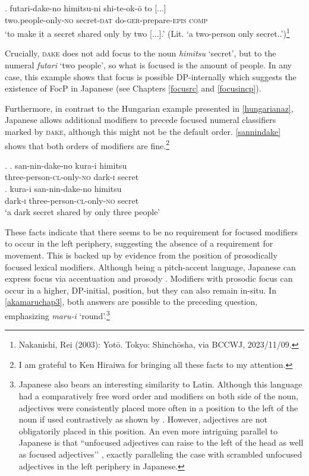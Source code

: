 \documentclass [output=book,colorlinks,citecolor=brown]{langscibook}
\begin{document}

\exg. futari-dake-no himitsu-ni shi-te-ok-ō to [...]\\
two.people-only-\textsc{no} secret-\textsc{dat} do-\textsc{ger}-prepare-\textsc{epis} \textsc{comp}\\
`to make it a secret shared only by two [...].’ (Lit. `a two-person only secret..’)\footnote{Nakanishi, Rei (2003): Yotō. Tokyo: Shinchōsha, via BCCWJ, 2023/11/09.} \label{himitsu}

Crucially, \textsc{dake} does not add focus to the noun \textit{himitsu} `secret’, but to the numeral \textit{futari} `two people’, so what is focused is the amount of people. In any case, this example shows that focus is possible DP-internally which suggests the existence of FocP in Japanese (see Chapters \ref{focusrc} and \ref{focusincp}).

Furthermore, in contrast to the Hungarian example presented in \ref{hungarianaz}, Japanese allows additional modifiers to precede focused numeral classifiers marked by \textsc{dake}, although this might not be the default order. \ref{sannindake} shows that both orders of modifiers are fine.\footnote{I am grateful to Ken Hiraiwa for bringing all these facts to my attention.}


\ex. \label{sannindake} \ag. san-nin-dake-no kura-i himitsu\\
three-person-\textsc{cl}-only-\textsc{no} dark-\textsc{i} secret\\
\bg. kura-i san-nin-dake-no himitsu\\
dark-\textsc{i} three-person-\textsc{cl}-only-\textsc{no} secret\\
`a dark secret shared by only three people’

These facts indicate that there seems to be no requirement for focused modifiers to occur in the left periphery, suggesting the absence of a requirement for movement. This is backed up by evidence from the position of prosodically focused lexical modifiers. Although being a pitch-accent language, Japanese can express focus via accentuation and prosody \citep{beckman:1986:intonational, hiraiwa:2012:syntactic, tomioka:2009:contrastive}. Modifiers with prosodic focus can occur in a higher, DP-initial, position, but they can also remain in-situ. In \ref{akamaruchap3}, both answers are possible to the preceding question, emphasizing \textit{maru-i} `round’.\footnote{Japanese also bears an interesting similarity to Latin. Although this language had a comparatively free word order and modifiers on both side of the noun, adjectives were consistently placed more often in a position to the left of the noun if used contrastively as shown by \citet{devine:2006:latin}. However, adjectives are not obligatorily placed in this position. An even more intriguing parallel to Japanese is that ``unfocused adjectives can raise to the left of the head as well as focused adjectives’’ \citep[409]{devine:2006:latin}, exactly paralleling the case with scrambled unfocused adjectives in the left periphery in Japanese.} %
\end{document}
